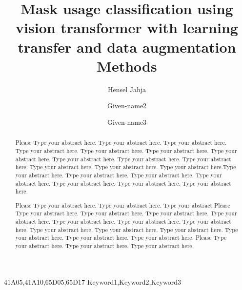 \documentclass[times,onecolumn,final,longtitle]{elsarticle}
\begin{document}

\begin{frontmatter}

  \title{Mask usage classification using vision transformer
    with learning transfer and data augmentation Methods}%

  \author{Hensel Jahja }
  \author{Given-name2 }
  \author{Given-name3 }

  \address[1]{Affiliation 1, Address, City and Postal Code, Country}
  \address[2]{Affiliation 2, Address, City and Postal Code, Country}



  \begin{abstract}
    Please Type your abstract here. Type your abstract here. Type your abstract
    here. Type your abstract here. Type your abstract here. Type your
    abstract here. Type your abstract here. Type your abstract here. Type
    your abstract here. Type your abstract here. Type your abstract here.
    Type your abstract here. Type your abstract here.Type your abstract here.
    Type your abstract here. Type your abstract here. Type your abstract here.
    Type your abstract here. Type your abstract here. Type your abstract here.

    Please Type your abstract here. Type your abstract here. Type your abstract
    Please Type your abstract here. Type your abstract here. Type your abstract
    here. Type your abstract here. Type your abstract here. Type your
    abstract here. Type your abstract here. Type your abstract here. Type
    your abstract here. Type your abstract here. Type your abstract here.
    Type your abstract here. Type your abstract here.
    Please Type your abstract here. Type your abstract here.
    Type your abstract here.
  \end{abstract}

  \begin{keyword}
    \MSC 41A05\sep 41A10\sep 65D05\sep 65D17
    \KWD Keyword1\sep Keyword2\sep Keyword3
  \end{keyword}

\end{frontmatter}
\end{document}

